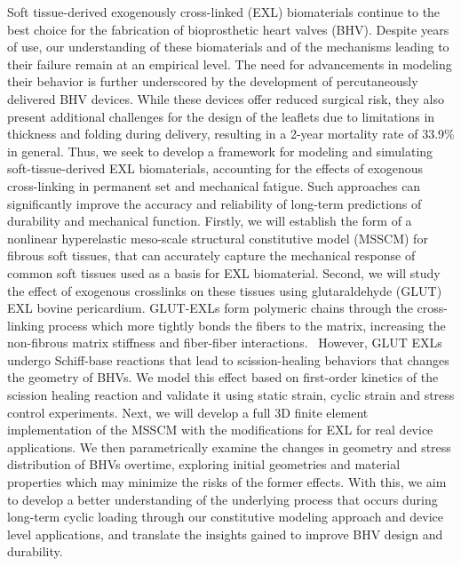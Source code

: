\documentclass[12pt]{report}
\begin{document}
\utabstract
{}%
\indent
Soft tissue-derived exogenously cross-linked (EXL) biomaterials continue to the best choice for the fabrication of bioprosthetic heart valves (BHV). Despite years of use, our understanding of these biomaterials and of the mechanisms leading to their failure remain at an empirical level. The need for advancements in modeling their behavior is further underscored by the development of percutaneously delivered BHV devices. While these devices offer reduced surgical risk, they also present additional challenges for the design of the leaflets due to limitations in thickness and folding during delivery, resulting in a 2-year mortality rate of 33.9\% in general. Thus, we seek to develop a framework for modeling and simulating soft-tissue-derived EXL biomaterials, accounting for the effects of exogenous cross-linking in permanent set and mechanical fatigue. Such approaches can significantly improve the accuracy and reliability of long-term predictions of durability and mechanical function. Firstly, we will establish the form of a nonlinear hyperelastic meso-scale structural constitutive model (MSSCM) for fibrous soft tissues, that can accurately capture the mechanical response of common soft tissues used as a basis for EXL biomaterial. Second, we will study the effect of exogenous crosslinks on these tissues using glutaraldehyde (GLUT) EXL bovine pericardium. GLUT-EXLs form polymeric chains through the cross-linking process which more tightly bonds the fibers to the matrix, increasing the non-fibrous matrix stiffness and fiber-fiber interactions.  However, GLUT EXLs undergo Schiff-base reactions that lead to scission-healing behaviors that changes the geometry of BHVs. We model this effect based on first-order kinetics of the scission healing reaction and validate it using static strain, cyclic strain and stress control experiments. Next, we will develop a full 3D finite element implementation of the MSSCM with the modifications for EXL for real device applications. We then parametrically examine the changes in geometry and stress distribution of BHVs overtime, exploring initial geometries and material properties which may minimize the risks of the former effects. With this, we aim to develop a better understanding of the underlying process that occurs during long-term cyclic loading through our constitutive modeling approach and device level applications, and translate the insights gained to improve BHV design and durability.

 
\tableofcontents{}
\end{document}
